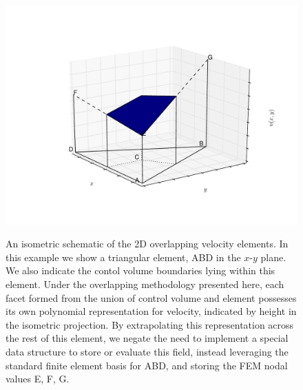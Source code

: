 
\begin{figure}[htp]
\begin{center}
\hbox{\hspace{-2.5cm}
\includegraphics[width=1.2\textwidth]{diagrams/overlapping}}
\caption{An isometric schematic of the 2D overlapping velocity
  elements. In this example we show a triangular element, ABD in the
  $x$-$y$ plane. We also indicate the contol volume boundaries lying
  within this element. Under the overlapping methodology presented
  here, each facet formed from the union of control volume and element
  possesses its own polynomial representation for velocity, indicated
  by height in the isometric projection. By extrapolating this
  representation across the rest of this element, we negate the need
  to implement a special data structure to store or evaluate this
  field, instead leveraging the standard finite element basis for ABD,
  and storing the FEM nodal values E, F, G. }
\label{fig:overlapping2d}
\end{center}
\end{figure}





